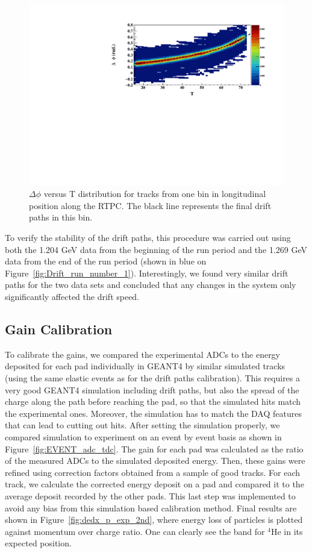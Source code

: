 \documentclass[preprint,5p]{elsarticle}
\begin{document}
\begin{figure}[tb]
\centering
\includegraphics[scale=0.42]{FitResult_p2_11.pdf}
\caption{$\Delta \phi$ versus T distribution for tracks
from one bin in longitudinal position along the RTPC. The black line represents 
the final drift paths in this bin.}
\label{fig:DELTA_PHI_TDC}
\end{figure}

To verify the stability of the drift paths, this procedure was carried out 
using both the 1.204 GeV data from the beginning of the run period and the 
1.269 GeV data from the end of the run period (shown in blue on 
Figure~\ref{fig:Drift_run_number_1}). Interestingly, we found very similar 
drift paths
for the two data sets and concluded that any changes in the system only
significantly affected the drift speed.

\subsection{Gain Calibration}

To calibrate the gains, we compared the experimental ADCs to the energy deposited 
for each pad individually in GEANT4 by similar simulated tracks (using the 
same elastic events as for the drift 
paths calibration). This requires a very good GEANT4 simulation 
including drift paths, but also the spread of the charge along the path
before reaching the pad, so that the simulated hits match the experimental 
ones. Moreover, the simulation has to match the DAQ features 
that can lead to cutting out hits. After setting the simulation properly, we 
compared simulation to experiment on an event by event basis as shown in 
Figure~\ref{fig:EVENT_adc_tdc}. The gain for each pad was calculated as the 
ratio of the measured ADCs to the simulated deposited energy.  Then, these 
gains were refined using correction factors obtained from a sample of good 
tracks. For each track, we calculate the corrected energy deposit on a pad and 
compared it to the average
deposit recorded by the other pads. This last step was implemented to 
avoid any bias from this simulation based calibration method.
Final results are shown in Figure~\ref{fig:dedx_p_exp_2nd}, where energy loss 
of particles is plotted against momentum over charge ratio. One can clearly see 
the band for $^4$He in its expected position.
\end{document}
